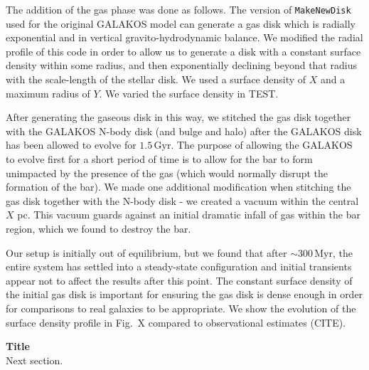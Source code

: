 \documentclass{natureprintstyle}
\begin{document}
The addition of the gas phase was done as follows. The version of
\texttt{MakeNewDisk} used for the original GALAKOS model can generate a gas
disk which is radially exponential and in vertical gravito-hydrodynamic
balance. We modified the radial profile of this code in order to allow us to
generate a disk with a constant surface density within some radius, and then
exponentially declining beyond that radius with the scale-length of the
stellar disk. We used a surface density of $X$ and a maximum radius of $Y$. We
varied the surface density in TEST.

After generating the gaseous disk in this way, we stitched the gas disk
together with the GALAKOS N-body disk (and bulge and halo) after the GALAKOS
disk has been allowed to evolve for $1.5\,\textrm{Gyr}$. The purpose of allowing
the GALAKOS to evolve first for a short period of time is to allow for the bar
to form unimpacted by the presence of the gas (which would normally disrupt
the formation of the bar). We made one additional modification when stitching
the gas disk together with the N-body disk - we created a vacuum within the
central $X$ pc. This vacuum guards against an initial dramatic infall of gas
within the bar region, which we found to destroy the bar.

Our setup is initially out of equilibrium, but we found that after
$\sim300\,\textrm{Myr}$, the entire system has settled into a steady-state
configuration and initial transients appear not to affect the results after
this point. The constant surface density of the initial gas disk is important
for ensuring the gas disk is dense enough in order for comparisons to real
galaxies to be appropriate. We show the evolution of the surface density
profile in Fig.~X compared to observational estimates (CITE).

\vspace{12pt}

\noindent
{\bf Title}
\\
\noindent
Next section.

\end{document}

